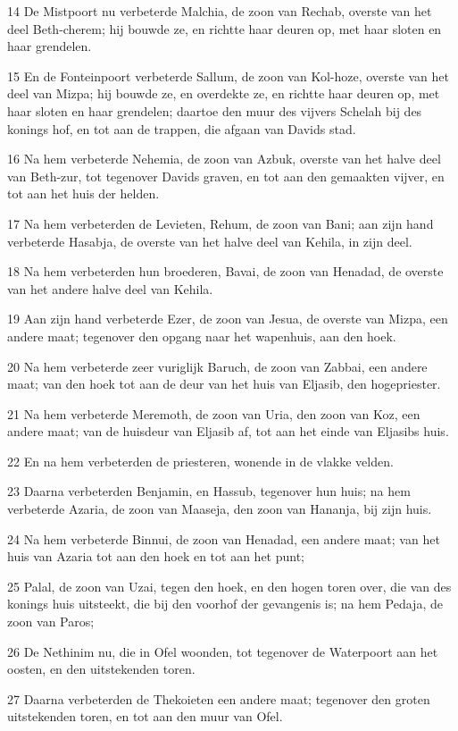 \par 14 De Mistpoort nu verbeterde Malchia, de zoon van Rechab, overste van het deel Beth-cherem; hij bouwde ze, en richtte haar deuren op, met haar sloten en haar grendelen.
\par 15 En de Fonteinpoort verbeterde Sallum, de zoon van Kol-hoze, overste van het deel van Mizpa; hij bouwde ze, en overdekte ze, en richtte haar deuren op, met haar sloten en haar grendelen; daartoe den muur des vijvers Schelah bij des konings hof, en tot aan de trappen, die afgaan van Davids stad.
\par 16 Na hem verbeterde Nehemia, de zoon van Azbuk, overste van het halve deel van Beth-zur, tot tegenover Davids graven, en tot aan den gemaakten vijver, en tot aan het huis der helden.
\par 17 Na hem verbeterden de Levieten, Rehum, de zoon van Bani; aan zijn hand verbeterde Hasabja, de overste van het halve deel van Kehila, in zijn deel.
\par 18 Na hem verbeterden hun broederen, Bavai, de zoon van Henadad, de overste van het andere halve deel van Kehila.
\par 19 Aan zijn hand verbeterde Ezer, de zoon van Jesua, de overste van Mizpa, een andere maat; tegenover den opgang naar het wapenhuis, aan den hoek.
\par 20 Na hem verbeterde zeer vuriglijk Baruch, de zoon van Zabbai, een andere maat; van den hoek tot aan de deur van het huis van Eljasib, den hogepriester.
\par 21 Na hem verbeterde Meremoth, de zoon van Uria, den zoon van Koz, een andere maat; van de huisdeur van Eljasib af, tot aan het einde van Eljasibs huis.
\par 22 En na hem verbeterden de priesteren, wonende in de vlakke velden.
\par 23 Daarna verbeterden Benjamin, en Hassub, tegenover hun huis; na hem verbeterde Azaria, de zoon van Maaseja, den zoon van Hananja, bij zijn huis.
\par 24 Na hem verbeterde Binnui, de zoon van Henadad, een andere maat; van het huis van Azaria tot aan den hoek en tot aan het punt;
\par 25 Palal, de zoon van Uzai, tegen den hoek, en den hogen toren over, die van des konings huis uitsteekt, die bij den voorhof der gevangenis is; na hem Pedaja, de zoon van Paros;
\par 26 De Nethinim nu, die in Ofel woonden, tot tegenover de Waterpoort aan het oosten, en den uitstekenden toren.
\par 27 Daarna verbeterden de Thekoieten een andere maat; tegenover den groten uitstekenden toren, en tot aan den muur van Ofel.
